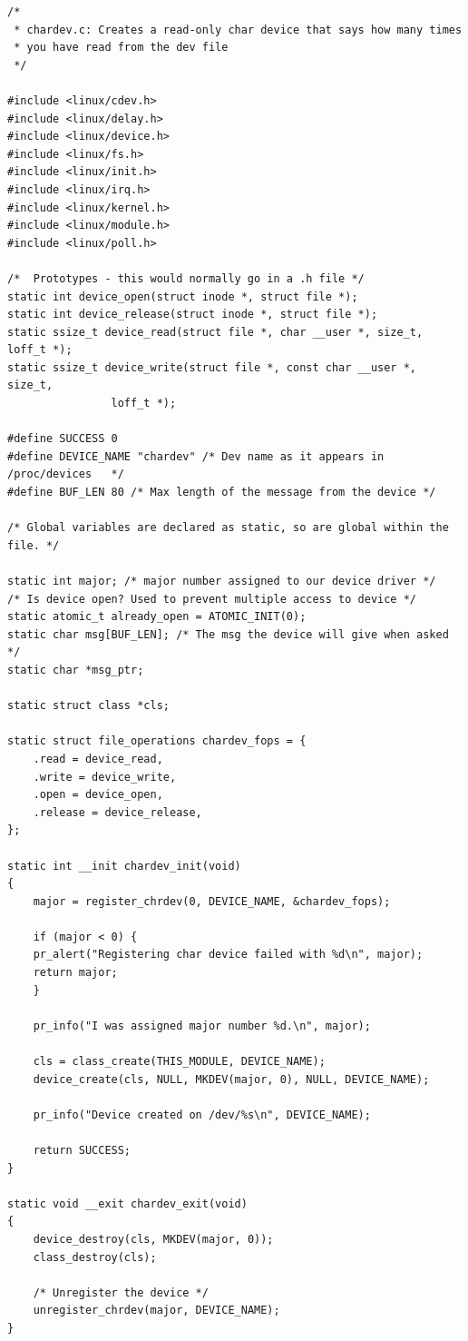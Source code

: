 \documentclass[11pt]{article}
\begin{document}
\begin{verbatim}
/*
 * chardev.c: Creates a read-only char device that says how many times
 * you have read from the dev file
 */

#include <linux/cdev.h>
#include <linux/delay.h>
#include <linux/device.h>
#include <linux/fs.h>
#include <linux/init.h>
#include <linux/irq.h>
#include <linux/kernel.h>
#include <linux/module.h>
#include <linux/poll.h>

/*  Prototypes - this would normally go in a .h file */
static int device_open(struct inode *, struct file *);
static int device_release(struct inode *, struct file *);
static ssize_t device_read(struct file *, char __user *, size_t, loff_t *);
static ssize_t device_write(struct file *, const char __user *, size_t,
			    loff_t *);

#define SUCCESS 0
#define DEVICE_NAME "chardev" /* Dev name as it appears in /proc/devices   */
#define BUF_LEN 80 /* Max length of the message from the device */

/* Global variables are declared as static, so are global within the file. */

static int major; /* major number assigned to our device driver */
/* Is device open? Used to prevent multiple access to device */
static atomic_t already_open = ATOMIC_INIT(0);
static char msg[BUF_LEN]; /* The msg the device will give when asked */
static char *msg_ptr;

static struct class *cls;

static struct file_operations chardev_fops = {
    .read = device_read,
    .write = device_write,
    .open = device_open,
    .release = device_release,
};

static int __init chardev_init(void)
{
    major = register_chrdev(0, DEVICE_NAME, &chardev_fops);

    if (major < 0) {
	pr_alert("Registering char device failed with %d\n", major);
	return major;
    }

    pr_info("I was assigned major number %d.\n", major);

    cls = class_create(THIS_MODULE, DEVICE_NAME);
    device_create(cls, NULL, MKDEV(major, 0), NULL, DEVICE_NAME);

    pr_info("Device created on /dev/%s\n", DEVICE_NAME);

    return SUCCESS;
}

static void __exit chardev_exit(void)
{
    device_destroy(cls, MKDEV(major, 0));
    class_destroy(cls);

    /* Unregister the device */
    unregister_chrdev(major, DEVICE_NAME);
}


\end{verbatim}
\end{document}
